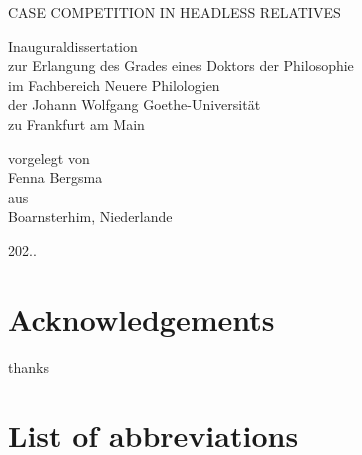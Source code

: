 \documentclass[11pt,hidelinks]{memoir}
\begin{document}

\frontmatter

\begin{titlingpage}

\center
\Large

CASE COMPETITION IN HEADLESS RELATIVES\\

\vspace{4em}

Inauguraldissertation\\
\vspace{1em}
zur Erlangung des Grades eines Doktors der Philosophie\\
\vspace{1em}
im Fachbereich Neuere Philologien\\
\vspace{1em}
der Johann Wolfgang Goethe-Universität\\
\vspace{1em}
zu Frankfurt am Main\\

\vspace{5em}

vorgelegt von\\
\vspace{1em}
Fenna Bergsma\\
\vspace{1em}
aus\\
\vspace{1em}
Boarnsterhim, Niederlande\\

\vspace{3em}

202..

\end{titlingpage}

\clearpage
\chapter*[Acknowledgements]{Acknowledgements}

thanks

\clearpage
\tableofcontents

\clearpage
\listoftables

\clearpage
\listoffigures

\chapter*[List of abbreviations]{List of abbreviations}
\begingroup
  \setlength{\LTleft}{-\tabcolsep}
\printacronyms[include=abbr, heading=none]
\endgroup
{}
\end{document}
